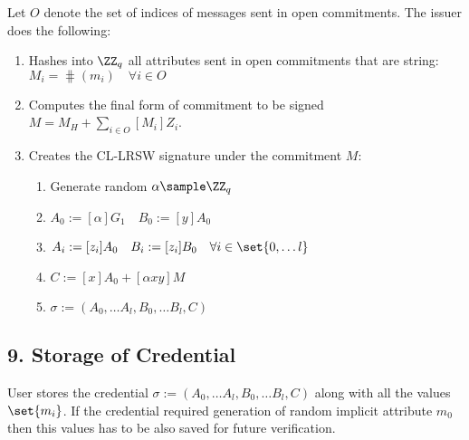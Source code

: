 Let $O$ denote the set of indices of messages sent in \textsf{open} commitments. The issuer does the following:
\begin{enumerate}
    \item Hashes into $\ZZ_q$ all attributes sent in \textsf{open} commitments that are \textsf{string}: $M_i = \hash({m_i}) \quad \forall i \in O$
    
    \item Computes the final form of commitment to be signed $M = M_H + \sum_{i \in O} [M_i]Z_i$.
    
    \item Creates the CL-LRSW signature under the commitment $M$:
    
    \begin{enumerate}
        \item[] Generate random $\alpha \sample \ZZ_q$
        \item[] $A_0 := [\alpha]G_1 \quad B_0 := [y]A_0$
        \item[] $A_i := [z_i]A_0 \quad B_i := [z_i]B_0 \quad \forall i \in \set{0, \dots l}$
        \item[] $C := [x]A_0 + [\alpha xy]M$
        \item[] $\sigma := (A_0, \dots A_l, B_0, \dots B_l, C)$
    \end{enumerate}
\end{enumerate}

\subsection*{9. Storage of Credential}

User stores the credential $\sigma := (A_0, \dots A_l, B_0, \dots B_l, C)$ along with all the values $\set{m_i}$. If the credential required generation of random implicit attribute $m_0$ then this values has to be also saved for future verification.


